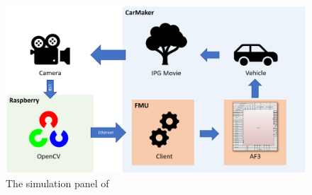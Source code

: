 \begin{figure}[!h]
	\centering
	\includegraphics[width=1\textwidth]{./img/lk_concept.png}
	\caption{The simulation panel of \af}
	\label{fig:simulation}
\end{figure}